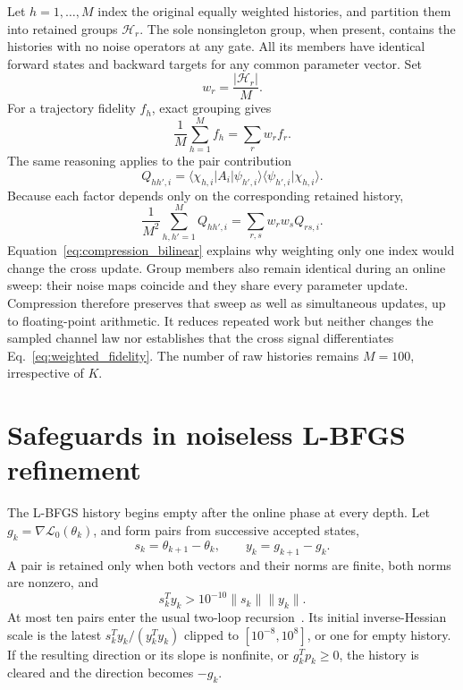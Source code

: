 Let $h=1,\ldots,M$ index the original equally weighted histories, and partition them into retained groups $\mathcal H_r$. The sole nonsingleton group, when present, contains the histories with no noise operators at any gate. All its members have identical forward states and backward targets for any common parameter vector. Set
\begin{equation}
    w_r=\frac{|\mathcal H_r|}{M}.
\end{equation}
For a trajectory fidelity $f_h$, exact grouping gives
\begin{equation}
    \frac1M\sum_{h=1}^{M}f_h
    =\sum_r w_rf_r.
    \label{eq:compression_linear}
\end{equation}
The same reasoning applies to the pair contribution
\begin{equation}
    Q_{hh',i}=\langle\chi_{h,i}|A_i|\psi_{h',i}\rangle
    \langle\psi_{h',i}|\chi_{h,i}\rangle.
\end{equation}
Because each factor depends only on the corresponding retained history,
\begin{equation}
    \frac1{M^2}\sum_{h,h'=1}^{M}Q_{hh',i}
    =\sum_{r,s}w_rw_sQ_{rs,i}.
    \label{eq:compression_bilinear}
\end{equation}
Equation~\eqref{eq:compression_bilinear} explains why weighting only one index would change the cross update. Group members also remain identical during an online sweep: their noise maps coincide and they share every parameter update. Compression therefore preserves that sweep as well as simultaneous updates, up to floating-point arithmetic. It reduces repeated work but neither changes the sampled channel law nor establishes that the cross signal differentiates Eq.~\eqref{eq:weighted_fidelity}. The number of raw histories remains $M=100$, irrespective of $K$.

\section{Safeguards in noiseless L-BFGS refinement}
\label{app:lbfgs}

The L-BFGS history begins empty after the online phase at every depth. Let $g_k=\nabla\mathcal L_0(\theta_k)$, and form pairs from successive accepted states,
\begin{equation}
    s_k=\theta_{k+1}-\theta_k,\qquad y_k=g_{k+1}-g_k.
\end{equation}
A pair is retained only when both vectors and their norms are finite, both norms are nonzero, and
\begin{equation}
    s_k^Ty_k>10^{-10}\|s_k\|\|y_k\|.
\end{equation}
At most ten pairs enter the usual two-loop recursion~\cite{LiuNocedal1989}. Its initial inverse-Hessian scale is the latest $s_k^Ty_k/(y_k^Ty_k)$ clipped to $[10^{-8},10^8]$, or one for empty history. If the resulting direction or its slope is nonfinite, or $g_k^Tp_k\geq0$, the history is cleared and the direction becomes $-g_k$.

